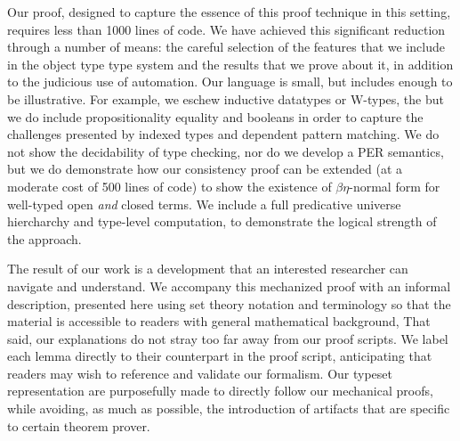 \documentclass[acmsmall,screen=true,
\ifpublic review=false\else,review=true\fi
  ,anonymous=\ifanonymous true\else false\fi]{acmart}
\newcommand{\lang}{$\lambda^H$\xspace}
\newcommand{\scw}[1]{}
\newcommand{\yl}[1]{}
\begin{document}
Our proof, designed to capture the essence of this proof technique in this
setting, requires less than 1000 lines of code. We have achieved this
significant reduction through a number of means: the careful selection of the
features that we include in the object type type system and the results that
we prove about it, in addition to the judicious use of automation.  Our
language is small, but includes enough to be illustrative. For example, we
eschew inductive datatypes or W-types, the but we do include propositionality
equality and booleans in order to capture the challenges presented by indexed
types and dependent pattern matching. We do not show the decidability of type
checking, nor do we develop a PER semantics, but we do demonstrate how our
consistency proof can be extended (at a moderate cost of 500 lines of code) to
show the existence of $\beta\eta$-normal form for well-typed open \emph{and}
closed terms. We include a full predicative universe hiercharchy and
type-level computation, to demonstrate the logical strength of the
approach. \scw{Say that we don't have impredicativity, but neither does anyone
  else?}\yl{Nobody else but Barras. I'll find the citation}


The result of our work is a development that an interested researcher can
navigate and understand. We accompany this mechanized proof with an informal
description, presented here using set theory notation and terminology so that
the material is accessible to readers with general mathematical background,
That said, our explanations do not stray too far away from our proof scripts.
We label each lemma directly to their counterpart in the proof script,
anticipating that readers may wish to reference and validate our formalism.
Our typeset representation are purposefully made to directly follow our
mechanical proofs, while avoiding, as much as possible, the introduction
of artifacts that are specific to certain theorem prover.
\end{document}
